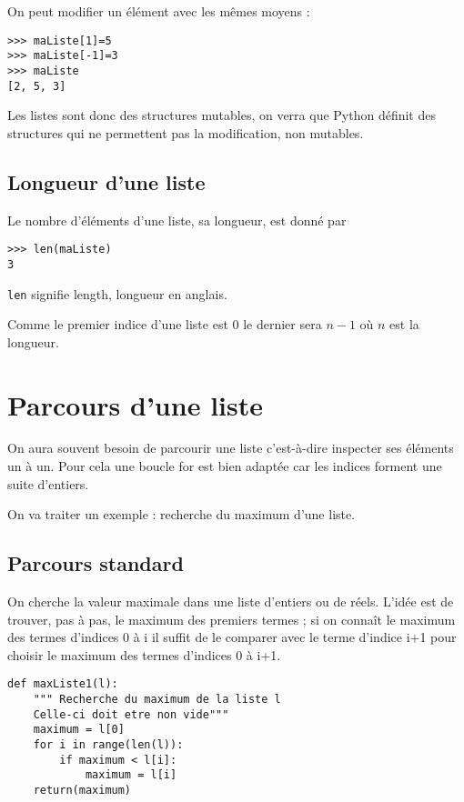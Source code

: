 On peut modifier un élément avec les mêmes moyens :
\begin{lstlisting}
>>> maListe[1]=5
>>> maListe[-1]=3
>>> maListe
[2, 5, 3]
\end{lstlisting}

Les listes sont donc des structures mutables, on verra que Python définit des structures qui ne permettent pas la modification, non mutables.

\subsection{Longueur d'une liste}

Le nombre d’éléments d’une liste, sa longueur, est donné par 
\begin{lstlisting}
>>> len(maListe)
3
\end{lstlisting}

\lstinline?len? signifie length, longueur en anglais.

Comme le premier indice d'une liste est 0 le dernier sera $n-1$ où $n$ est la longueur.


\section{Parcours d’une liste}

On aura souvent besoin de parcourir une liste c’est-à-dire inspecter ses éléments un à un.
Pour cela une boucle for est bien adaptée car les indices forment une suite d’entiers.

On va traiter un exemple : recherche du maximum d'une liste.

\subsection{Parcours standard}

On cherche la valeur maximale dans une liste d’entiers ou de réels.
L’idée est de trouver, pas à pas, le maximum des premiers termes ; 
si on connaît le maximum des termes d’indices 0 à i il suffit de le comparer avec le terme d’indice i+1 pour choisir le maximum des termes d’indices 0 à i+1.

\begin{lstlisting}
def maxListe1(l):
	""" Recherche du maximum de la liste l
	Celle-ci doit etre non vide"""
    maximum = l[0]
    for i in range(len(l)):
        if maximum < l[i]:
            maximum = l[i]
    return(maximum)
\end{lstlisting}

